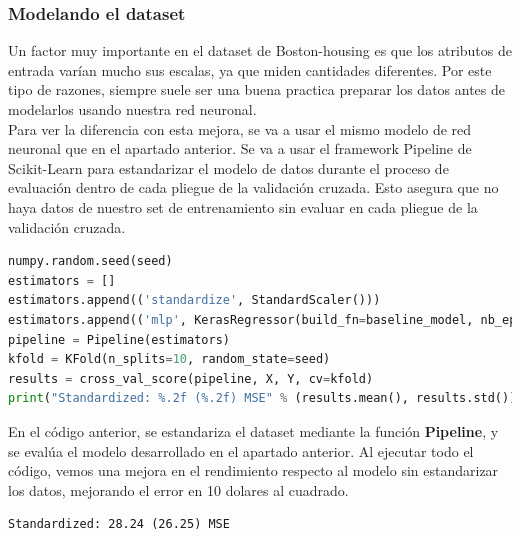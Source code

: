 \subsubsection{Modelando el dataset}
Un factor muy importante en el dataset de Boston-housing es que los atributos de entrada varían mucho sus escalas, ya que miden cantidades diferentes. Por este tipo de razones, siempre suele ser una buena practica preparar los datos antes de modelarlos usando nuestra red neuronal.\\
Para ver la diferencia con esta mejora, se va a usar el mismo modelo de red neuronal que en el apartado anterior. Se va a usar el framework Pipeline de Scikit-Learn para estandarizar el modelo de datos durante el proceso de evaluación dentro de cada pliegue de la validación cruzada. Esto asegura que no haya datos de nuestro set de entrenamiento sin evaluar en cada pliegue de la validación cruzada.
\begin{lstlisting}[language=Python]
numpy.random.seed(seed)
estimators = []
estimators.append(('standardize', StandardScaler()))
estimators.append(('mlp', KerasRegressor(build_fn=baseline_model, nb_epoch=50, batch_size=5, verbose=0)))
pipeline = Pipeline(estimators)
kfold = KFold(n_splits=10, random_state=seed)
results = cross_val_score(pipeline, X, Y, cv=kfold)
print("Standardized: %.2f (%.2f) MSE" % (results.mean(), results.std()))
\end{lstlisting}
En el código anterior, se estandariza el dataset mediante la función \textbf{Pipeline}, y se evalúa el modelo desarrollado en el apartado anterior. Al ejecutar todo el código, vemos una mejora en el rendimiento respecto al modelo sin estandarizar los datos, mejorando el error en 10 dolares al cuadrado.\\
\begin{verbatim}
Standardized: 28.24 (26.25) MSE
\end{verbatim}
